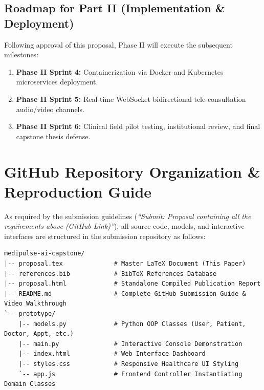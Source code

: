 \documentclass[11pt,a4paper]{article}
\begin{document}
\subsection{Roadmap for Part II (Implementation \& Deployment)}
Following approval of this proposal, Phase II will execute the subsequent milestones:
\begin{enumerate}
    \item \textbf{Phase II Sprint 4:} Containerization via Docker and Kubernetes microservices deployment.
    \item \textbf{Phase II Sprint 5:} Real-time WebSocket bidirectional tele-consultation audio/video channels.
    \item \textbf{Phase II Sprint 6:} Clinical field pilot testing, institutional review, and final capstone thesis defense.
\end{enumerate}

\newpage



\newpage
\appendix
\section{GitHub Repository Organization \& Reproduction Guide}
As required by the submission guidelines (\textit{``Submit: Proposal containing all the requirements above (GitHub Link)''}), all source code, models, and interactive interfaces are structured in the submission repository as follows:

\begin{verbatim}
medipulse-ai-capstone/
|-- proposal.tex              # Master LaTeX Document (This Paper)
|-- references.bib            # BibTeX References Database
|-- proposal.html             # Standalone Compiled Publication Report
|-- README.md                 # Complete GitHub Submission Guide & Video Walkthrough
`-- prototype/
    |-- models.py             # Python OOP Classes (User, Patient, Doctor, Appt, etc.)
    |-- main.py               # Interactive Console Demonstration
    |-- index.html            # Web Interface Dashboard
    |-- styles.css            # Responsive Healthcare UI Styling
    `-- app.js                # Frontend Controller Instantiating Domain Classes
\end{verbatim}
\end{document}
